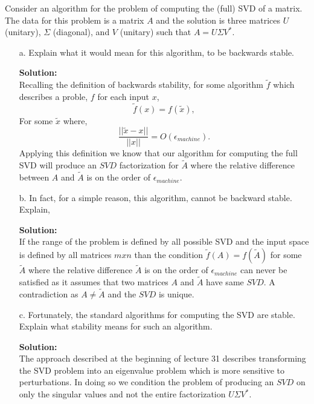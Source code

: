\documentclass[12pt]{article}
\makeatletter
\theoremstyle{homework}
\newenvironment{exercise}[1]
{\def\@currentlabel{#1}\exercisecore}
{\endexercisecore}
\newcommand{\localhead}[1]{\par\smallskip\noindent\textbf{#1}\nobreak\\}%
\newcommand\solution{\localhead{Solution:}}
\newcommand{\emach}{\ensuremath{\epsilon_{machine}}}
\makeatother
\begin{document}
\begin{exercise}{15.2} Consider an algorithm for the problem of computing the (full) SVD
  of a matrix. The data for this problem is a matrix $A$ and the solution is 
  three matrices $U$ (unitary), $\Sigma$ (diagonal), and $V$ (unitary) such that $A = U\Sigma V^*$.
  \begin{enumerate}
    \item[a.] Explain what it would mean for this algorithm, to be backwards stable.\\
    \solution Recalling the definition of backwards stability, for some algorithm $\tilde{f}$ which describes a proble, 
    $f$ for each input $x$, 
    \begin{equation*}
      \tilde{f}(x) = f(\tilde{x}),  
    \end{equation*}
    For some $\tilde{x}$ where, 
    \begin{equation*}
      \dfrac{||\tilde{x} - x||}{||x||} = O(\emach).
    \end{equation*}
    Applying this definition we know that our algorithm for computing the full SVD will produce an $SVD$ factorization for $\tilde{A}$ where 
    the relative difference between $A$ and $\tilde{A}$ is on the order of $\emach$.
    
    \vspace{.15in}

    \item[b.] In fact, for a simple reason, this algorithm, cannot be backward stable. Explain,\\
    \solution If the range of the problem is defined by all possible SVD and the input space is defined by all 
    matrices $mxn$ than the condition $\tilde{f}(A) = f(\tilde{A})$ for some $\tilde{A}$ where the relative difference $\tilde{A}$ is on the order of $\emach$ can never be satisfied as it assumes that 
    two matrices $A$ and $\tilde{A}$ have same $SVD$. A contradiction as $A \neq \tilde{A}$ and the $SVD$ is unique. \\

    \vspace{.15in}
    \item[c.] Fortunately, the standard algorithms for computing the SVD are stable. Explain what stability means for such an algorithm.\\
    \solution  The approach described at the beginning of lecture 31 describes transforming the SVD problem into an eigenvalue problem which is more sensitive to perturbations. In doing so
    we condition the problem of producing an $SVD$ on only the singular values and not the entire factorization $U\Sigma V^*$. 
  \end{enumerate}
\end{exercise}
\end{document}
